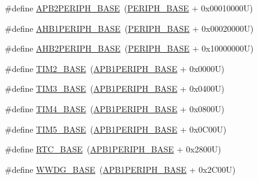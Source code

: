 \begin{DoxyCompactItemize}
\item 
\#define \hyperlink{group___peripheral__registers__structures_ga25b99d6065f1c8f751e78f43ade652cb}{A\+P\+B2\+P\+E\+R\+I\+P\+H\+\_\+\+B\+A\+SE}~(\hyperlink{group___peripheral__memory__map_ga9171f49478fa86d932f89e78e73b88b0}{P\+E\+R\+I\+P\+H\+\_\+\+B\+A\+SE} + 0x00010000\+U)
\item 
\#define \hyperlink{group___peripheral__registers__structures_ga811a9a4ca17f0a50354a9169541d56c4}{A\+H\+B1\+P\+E\+R\+I\+P\+H\+\_\+\+B\+A\+SE}~(\hyperlink{group___peripheral__memory__map_ga9171f49478fa86d932f89e78e73b88b0}{P\+E\+R\+I\+P\+H\+\_\+\+B\+A\+SE} + 0x00020000\+U)
\item 
\#define \hyperlink{group___peripheral__registers__structures_gaeedaa71d22a1948492365e2cd26cfd46}{A\+H\+B2\+P\+E\+R\+I\+P\+H\+\_\+\+B\+A\+SE}~(\hyperlink{group___peripheral__memory__map_ga9171f49478fa86d932f89e78e73b88b0}{P\+E\+R\+I\+P\+H\+\_\+\+B\+A\+SE} + 0x10000000\+U)
\item 
\#define \hyperlink{group___peripheral__registers__structures_ga00d0fe6ad532ab32f0f81cafca8d3aa5}{T\+I\+M2\+\_\+\+B\+A\+SE}~(\hyperlink{group___peripheral__memory__map_ga45666d911f39addd4c8c0a0ac3388cfb}{A\+P\+B1\+P\+E\+R\+I\+P\+H\+\_\+\+B\+A\+SE} + 0x0000\+U)
\item 
\#define \hyperlink{group___peripheral__registers__structures_gaf0c34a518f87e1e505cd2332e989564a}{T\+I\+M3\+\_\+\+B\+A\+SE}~(\hyperlink{group___peripheral__memory__map_ga45666d911f39addd4c8c0a0ac3388cfb}{A\+P\+B1\+P\+E\+R\+I\+P\+H\+\_\+\+B\+A\+SE} + 0x0400\+U)
\item 
\#define \hyperlink{group___peripheral__registers__structures_ga56e2d44b0002f316527b8913866a370d}{T\+I\+M4\+\_\+\+B\+A\+SE}~(\hyperlink{group___peripheral__memory__map_ga45666d911f39addd4c8c0a0ac3388cfb}{A\+P\+B1\+P\+E\+R\+I\+P\+H\+\_\+\+B\+A\+SE} + 0x0800\+U)
\item 
\#define \hyperlink{group___peripheral__registers__structures_ga3e1671477190d065ba7c944558336d7e}{T\+I\+M5\+\_\+\+B\+A\+SE}~(\hyperlink{group___peripheral__memory__map_ga45666d911f39addd4c8c0a0ac3388cfb}{A\+P\+B1\+P\+E\+R\+I\+P\+H\+\_\+\+B\+A\+SE} + 0x0\+C00\+U)
\item 
\#define \hyperlink{group___peripheral__registers__structures_ga4265e665d56225412e57a61d87417022}{R\+T\+C\+\_\+\+B\+A\+SE}~(\hyperlink{group___peripheral__memory__map_ga45666d911f39addd4c8c0a0ac3388cfb}{A\+P\+B1\+P\+E\+R\+I\+P\+H\+\_\+\+B\+A\+SE} + 0x2800\+U)
\item 
\#define \hyperlink{group___peripheral__registers__structures_ga9a5bf4728ab93dea5b569f5b972cbe62}{W\+W\+D\+G\+\_\+\+B\+A\+SE}~(\hyperlink{group___peripheral__memory__map_ga45666d911f39addd4c8c0a0ac3388cfb}{A\+P\+B1\+P\+E\+R\+I\+P\+H\+\_\+\+B\+A\+SE} + 0x2\+C00\+U)

\end{DoxyCompactItemize}
